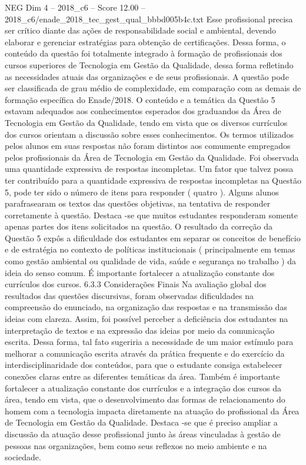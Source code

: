 \begin{textsample}{NEG Dim 4 – 2018\_c6 – Score 12.00 – 2018\_c6/enade\_2018\_tec\_gest\_qual\_bbbd005b4c.txt}
Esse profissional precisa ser crítico diante das ações de responsabilidade social e ambiental, devendo elaborar e gerenciar estratégias para obtenção de certificações.
Dessa forma, o conteúdo da questão foi totalmente integrado à formação de profissionais dos cursos superiores de Tecnologia em Gestão da Qualidade, dessa forma refletindo as necessidades atuais das organizações e de seus profissionais.
A questão pode ser classificada de grau médio de complexidade, em comparação com as demais de formação específica do Enade/2018.
O conteúdo e a temática da Questão 5 estavam adequados aos conhecimentos esperados dos graduandos da Área de Tecnologia em Gestão da Qualidade, tendo em vista que os diversos currículos dos cursos orientam a discussão sobre esses conhecimentos.
Os termos utilizados pelos alunos em suas respostas não foram distintos aos comumente empregados pelos profissionais da Área de Tecnologia em Gestão da Qualidade.
Foi observada uma quantidade expressiva de respostas incompletas.
Um fator que talvez possa ter contribuído para a quantidade expressiva de respostas incompletas na Questão 5, pode ter sido o número de itens para responder ( quatro ).
Alguns alunos parafrasearam os textos das questões objetivas, na tentativa de responder corretamente à questão.
Destaca -se que muitos estudantes responderam somente apenas partes dos itens solicitados na questão.
O resultado da correção da Questão 5 expôs a dificuldade dos estudantes em separar os conceitos de benefício e de estratégia no contexto de políticas institucionais ( principalmente em temas como gestão ambiental ou qualidade de vida, saúde e segurança no trabalho ) da ideia do senso comum.
É importante fortalecer a atualização constante dos currículos dos cursos. 6.3.3 Considerações Finais Na avaliação global dos resultados das questões discursivas, foram observadas dificuldades na compreensão do enunciado, na organização das respostas e na transmissão das ideias com clareza.
Assim, foi possível perceber a deficiência dos estudantes na interpretação de textos e na expressão das ideias por meio da comunicação escrita.
Dessa forma, tal fato sugeriria a necessidade de um maior estímulo para melhorar a comunicação escrita através da prática frequente e do exercício da interdisciplinaridade dos conteúdos, para que o estudante consiga estabelecer conexões claras entre as diferentes temáticas da área.
Também é importante fortalecer a atualização constante dos currículos e a integração dos cursos da área, tendo em vista, que o desenvolvimento das formas de relacionamento do homem com a tecnologia impacta diretamente na atuação do profissional da Área de Tecnologia em Gestão da Qualidade.
Destaca -se que é preciso ampliar a discussão da atuação desse profissional junto às áreas vinculadas à gestão de pessoas nas organizações, bem como seus reflexos no meio ambiente e na sociedade.

\end{textsample}
